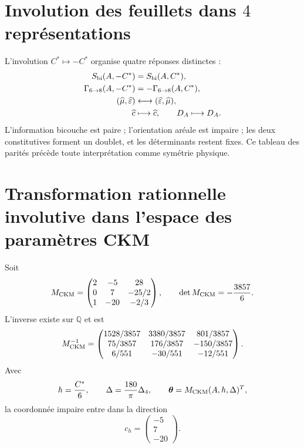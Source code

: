 \section{Involution des feuillets dans \(4\) représentations}

L'involution \(C^*\mapsto-C^*\) organise quatre réponses distinctes :
\begin{equation}
\label{eq:modular-sheet-parities}
\begin{aligned}
S_{\rm bi}(A,-C^*)&=S_{\rm bi}(A,C^*),\\
\Gamma_{6\to8}(A,-C^*)&=-\Gamma_{6\to8}(A,C^*),\\
(\widehat\mu,\widehat\varepsilon)&\longleftrightarrow
(\widehat\varepsilon,\widehat\mu),\\
\widehat c&\longmapsto\widehat c,
\qquad D_A\longmapsto D_A.
\end{aligned}
\end{equation}
L'information bicouche est paire ; l'orientation aréale est impaire ; les deux
constitutives forment un doublet, et les déterminants restent fixes. Ce tableau
des parités précède toute interprétation comme symétrie physique.

\section{Transformation rationnelle involutive dans l'espace des paramètres CKM}

Soit
\begin{equation}
\label{eq:modular-Mckm}
M_{\rm CKM}=
\begin{pmatrix}
2&-5&28\\
0&7&-25/2\\
1&-20&-2/3
\end{pmatrix},
\qquad
\det M_{\rm CKM}=-\frac{3857}{6}.
\end{equation}
L'inverse existe sur \(\mathbb Q\) et est
\begin{equation}
\label{eq:modular-Mckm-inverse}
M_{\rm CKM}^{-1}=
\begin{pmatrix}
1528/3857&3380/3857&801/3857\\
75/3857&176/3857&-150/3857\\
6/551&-30/551&-12/551
\end{pmatrix}.
\end{equation}
Avec
\begin{equation}
\label{eq:modular-ckm-coordinates}
h=\frac{C^*}{6},
\qquad
\Delta=\frac{180}{\pi}\Delta_4,
\qquad
\boldsymbol\theta=M_{\rm CKM}(A,h,\Delta)^T,
\end{equation}
la coordonnée impaire entre dans la direction
\begin{equation}
\label{eq:modular-ch}
c_h=\begin{pmatrix}-5\\7\\-20\end{pmatrix}.
\end{equation}

